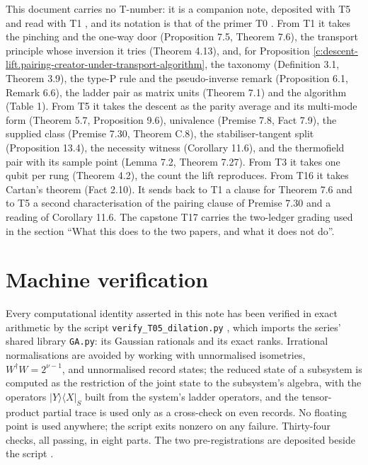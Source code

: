 \documentclass[11pt]{article}
\theoremstyle{definition}
\theoremstyle{plain}
\providecommand{\bra}{}\renewcommand{\bra}[1]{\langle #1|}
\providecommand{\ket}{}\renewcommand{\ket}[1]{|#1\rangle}
\begin{document}
\label{c:note.descent-lift.setting-position-series}
This document carries no T-number: it is a companion note, deposited with T5 \cite{ButlerT5} and read with T1 \cite{ButlerT1}, and its notation is that of the primer T0 \cite{ButlerT0}. From T1 it takes the pinching and the one-way door (Proposition 7.5, Theorem 7.6), the transport principle whose inversion it tries (Theorem 4.13), and, for Proposition \ref{c:descent-lift.pairing-creator-under-transport-algorithm}, the taxonomy (Definition 3.1, Theorem 3.9), the type-P rule and the pseudo-inverse remark (Proposition 6.1, Remark 6.6), the ladder pair as matrix units (Theorem 7.1) and the algorithm (Table 1). From T5 it takes the descent as the parity average and its multi-mode form (Theorem 5.7, Proposition 9.6), univalence (Premise 7.8, Fact 7.9), the supplied class (Premise 7.30, Theorem C.8), the stabiliser-tangent split (Proposition 13.4), the necessity witness (Corollary 11.6), and the thermofield pair with its sample point (Lemma 7.2, Theorem 7.27). From T3 \cite{ButlerT3} it takes one qubit per rung (Theorem 4.2), the count the lift reproduces. From T16 \cite{ButlerT16} it takes Cartan's theorem (Fact 2.10). It sends back to T1 a clause for Theorem 7.6 and to T5 a second characterisation of the pairing clause of Premise 7.30 and a reading of Corollary 11.6. The capstone T17 \cite{ButlerT17} carries the two-ledger grading used in the section ``What this does to the two papers, and what it does not do''.

\section{Machine verification}

\label{c:note.descent-lift.setting-machine-verification}
Every computational identity asserted in this note has been verified in exact arithmetic by the script \texttt{verify\_T05\_dilation.py} \cite{ButlerVerifyT05dilation}, which imports the series' shared library \texttt{GA.py}: its Gaussian rationals and its exact ranks. Irrational normalisations are avoided by working with unnormalised isometries, $W^{\dagger}W = 2^{\nu-1}$, and unnormalised record states; the reduced state of a subsystem is computed as the restriction of the joint state to the subsystem's algebra, with the operators $\ket{Y}\bra{X}_{S}$ built from the system's ladder operators, and the tensor-product partial trace is used only as a cross-check on even records. No floating point is used anywhere; the script exits nonzero on any failure. Thirty-four checks, all passing, in eight parts. The two pre-registrations are deposited beside the script \cite{ButlerPreregT05dilation, ButlerPreregT05pairing}.
\end{document}
